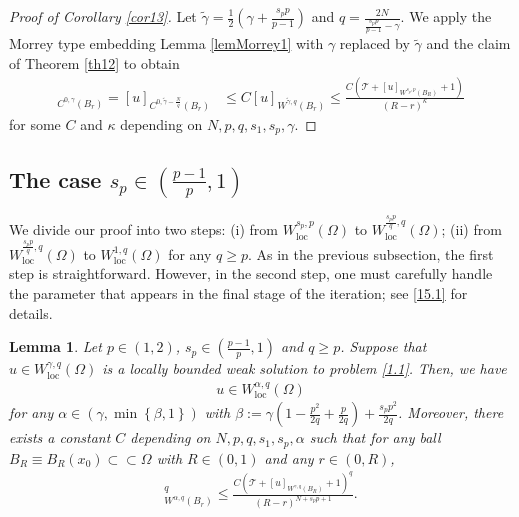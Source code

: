 \documentclass[reqno,10pt]{amsart}
\numberwithin{equation}{section}
\newtheorem{lemma}[theorem]{Lemma}
\begin{document}
\begin{proof}[Proof of Corollary \ref{cor13}]
	Let $\tilde{\gamma}=\frac{1}{2}\left( \gamma+\frac{s_pp}{p-1}\right) $ and $q=\frac{2N}{\frac{s_pp}{p-1}-\gamma}$. We apply the Morrey type embedding Lemma \ref{lemMorrey1} with $\gamma$ replaced by $\tilde{\gamma}$ and the claim of Theorem \ref{th12} to obtain
	\begin{align*}
		[u]_{C^{0,\gamma}(B_r)}=[u]_{C^{0,\tilde{\gamma}-\frac{N}{q}}(B_r)}&\le C[u]_{W^{\tilde{\gamma},q}(B_r)}\le \frac{C\left( \mathcal{T}+[u]_{W^{s_p,p}(B_R)}+1\right) }{(R-r)^{\kappa}}
	\end{align*}
	for some $C$ and $\kappa$ depending on $N, p, q, s_1, s_p, \gamma$.
\end{proof}

\subsection{The case $s_p\in \left( \frac{p-1}{p},1\right) $}

We divide our proof into two steps: (i) from $W^{s_p,p}_\mathrm{loc}(\Omega)$ to $W^{\frac{s_pp}{q},q}_\mathrm{loc}(\Omega)$; (ii) from  $W^{\frac{s_pp}{q},q}_\mathrm{loc}(\Omega)$ to $W^{1,q}_\mathrm{loc}(\Omega)$ for any $q\ge p$. As in the previous subsection, the first step is straightforward. However, in the second step, one must carefully handle the parameter that appears in the final stage of the iteration;  see \eqref{15.1} for details.

\begin{lemma}
	\label{lem140}
	Let $p\in (1,2)$, $s_p\in \left( \frac{p-1}{p}, 1\right) $ and $q\ge p$. Suppose that $u\in W^{\gamma,q}_{\mathrm{loc}}(\Omega)$ is a locally bounded weak solution to problem \eqref{1.1}. Then, we have
	\begin{align*}
		u\in W^{\alpha,q}_{\mathrm{loc}}(\Omega)
	\end{align*} 
	for any $\alpha\in (\gamma,\min\left\lbrace \beta,1\right\rbrace )$ with $\beta:=\gamma\left(1-\frac{p^2}{2q}+\frac{p}{2q}\right)+\frac{s_pp^2}{2q}$. Moreover, there exists a constant $C$ depending on $N,p,q,s_1,s_p,\alpha$ such that for any ball $B_R\equiv B_R(x_0)\subset\subset\Omega$ with $R\in(0,1)$ and any $r\in (0,R)$,
	\begin{align*}
		[u]^q_{W^{\alpha,q}(B_r)}\le \frac{C\left( \mathcal{T}+[u]_{W^{\gamma,q}(B_R)}+1\right)^q }{(R-r)^{N+s_pp+1}}.
	\end{align*}
\end{lemma}
\end{document}
